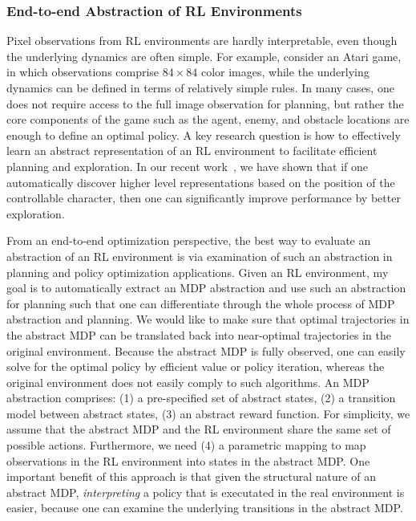 \documentclass[a4paper, 10pt]{article}
\begin{document}
\subsubsection*{End-to-end Abstraction of RL Environments}

Pixel observations from RL environments are hardly interpretable, even
though the underlying dynamics are often simple. For example, consider
an Atari game, in which observations comprise $84\!\times\!84$ color
images, while the underlying dynamics can be defined in terms of
relatively simple rules. In many cases, one does not require access to
the full image observation for planning, but rather the core
components of the game such as the agent, enemy, and obstacle
locations are enough to define an optimal policy. A key research
question is how to effectively learn an abstract representation of an
RL environment to facilitate efficient planning and exploration. In
our recent work~\cite{contingency}, we have shown that if one
automatically discover higher level representations based on the
position of the controllable character, then one can significantly
improve performance by better exploration.

From an end-to-end optimization perspective, the best way to evaluate
an abstraction of an RL environment is via examination of such an
abstraction in planning and policy optimization applications. Given an
RL environment, my goal is to automatically extract an MDP abstraction
and use such an abstraction for planning such that one can
differentiate through the whole process of MDP abstraction and
planning. We would like to make sure that optimal trajectories in the
abstract MDP can be translated back into near-optimal trajectories in
the original environment. Because the abstract MDP is fully observed,
one can easily solve for the optimal policy by efficient value or
policy iteration, whereas the original environment does not easily
comply to such algorithms. An MDP abstraction comprises: (1) a
pre-specified set of abstract states, (2) a transition model between
abstract states, (3) an abstract reward function. For simplicity, we
assume that the abstract MDP and the RL environment share the same set
of possible actions. Furthermore, we need (4) a parametric mapping to
map observations in the RL environment into states in the abstract
MDP. One important benefit of this approach is that given the
structural nature of an abstract MDP, {\em interpreting} a policy that
is executated in the real environment is easier, because one can
examine the underlying transitions in the abstract MDP.
\end{document}
